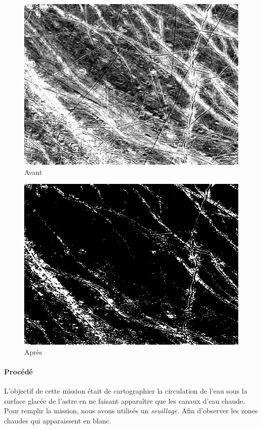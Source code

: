 	\begin{figure}[h]
	\centering
		\begin{multicols}{2}
		\includegraphics[scale=0.5]{images/Europa_surface.png}
		Avant

		\includegraphics[scale=0.5]{images/MissionA3.png}
		Après
		\end{multicols}
	\end{figure}
	\vspace{-0.9cm}

	\paragraph{Procédé}	
		L'objectif de cette mission était de cartographier la circulation de l'eau sous la surface glacée de l'astre en ne faisant apparaître que les canaux d'eau chaude. Pour remplir la mission, nous avons utilisés un \emph{seuillage}. Afin d'observer les zones chaudes qui apparaissent en blanc.